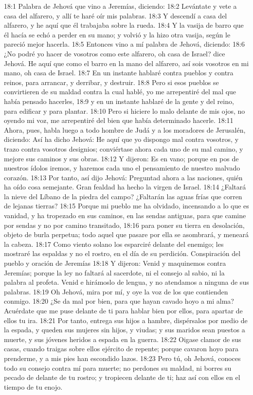 18:1 Palabra de Jehová que vino a Jeremías, diciendo: 
18:2 Levántate y vete a casa del alfarero, y allí te haré oír mis palabras. 
18:3 Y descendí a casa del alfarero, y he aquí que él trabajaba sobre la rueda. 
18:4 Y la vasija de barro que él hacía se echó a perder en su mano; y volvió y la hizo otra vasija, según le pareció mejor hacerla. 
18:5 Entonces vino a mí palabra de Jehová, diciendo: 
18:6 ¿No podré yo hacer de vosotros como este alfarero, oh casa de Israel? dice Jehová. He aquí que como el barro en la mano del alfarero, así sois vosotros en mi mano, oh casa de Israel. 
18:7 En un instante hablaré contra pueblos y contra reinos, para arrancar, y derribar, y destruir. 
18:8 Pero si esos pueblos se convirtieren de su maldad contra la cual hablé, yo me arrepentiré del mal que había pensado hacerles, 
18:9 y en un instante hablaré de la gente y del reino, para edificar y para plantar. 
18:10 Pero si hiciere lo malo delante de mis ojos, no oyendo mi voz, me arrepentiré del bien que había determinado hacerle. 
18:11 Ahora, pues, habla luego a todo hombre de Judá y a los moradores de Jerusalén, diciendo: Así ha dicho Jehová: He aquí que yo dispongo mal contra vosotros, y trazo contra vosotros designios; conviértase ahora cada uno de su mal camino, y mejore sus caminos y sus obras. 
18:12 Y dijeron: Es en vano; porque en pos de nuestros ídolos iremos, y haremos cada uno el pensamiento de nuestro malvado corazón. 
18:13 Por tanto, así dijo Jehová: Preguntad ahora a las naciones, quién ha oído cosa semejante. Gran fealdad ha hecho la virgen de Israel. 
18:14 ¿Faltará la nieve del Líbano de la piedra del campo? ¿Faltarán las aguas frías que corren de lejanas tierras? 
18:15 Porque mi pueblo me ha olvidado, incensando a lo que es vanidad, y ha tropezado en sus caminos, en las sendas antiguas, para que camine por sendas y no por camino transitado, 
18:16 para poner su tierra en desolación, objeto de burla perpetua; todo aquel que pasare por ella se asombrará, y meneará la cabeza. 
18:17 Como viento solano los esparciré delante del enemigo; les mostraré las espaldas y no el rostro, en el día de su perdición. 
Conspiración del pueblo y oración de Jeremías 
18:18 Y dijeron: Venid y maquinemos contra Jeremías; porque la ley no faltará al sacerdote, ni el consejo al sabio, ni la palabra al profeta. Venid e hirámoslo de lengua, y no atendamos a ninguna de sus palabras. 
18:19 Oh Jehová, mira por mí, y oye la voz de los que contienden conmigo. 
18:20 ¿Se da mal por bien, para que hayan cavado hoyo a mi alma? Acuérdate que me puse delante de ti para hablar bien por ellos, para apartar de ellos tu ira. 
18:21 Por tanto, entrega sus hijos a hambre, dispérsalos por medio de la espada, y queden sus mujeres sin hijos, y viudas; y sus maridos sean puestos a muerte, y sus jóvenes heridos a espada en la guerra. 
18:22 Oigase clamor de sus casas, cuando traigas sobre ellos ejército de repente; porque cavaron hoyo para prenderme, y a mis pies han escondido lazos. 
18:23 Pero tú, oh Jehová, conoces todo su consejo contra mí para muerte; no perdones su maldad, ni borres su pecado de delante de tu rostro; y tropiecen delante de ti; haz así con ellos en el tiempo de tu enojo. 

